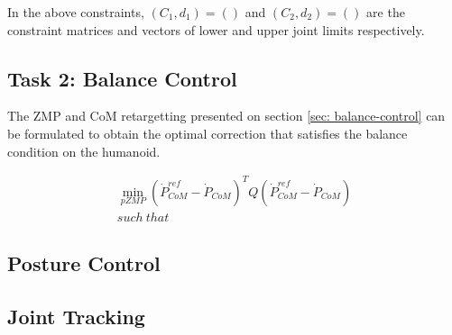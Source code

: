 In the above constraints, $(C_1, d_1) = ()$ and $(C_2, d_2) = ()$ are the constraint matrices and vectors of lower and upper joint limits respectively.

\subsection[Balance Control]{Task 2: Balance Control}

The ZMP and CoM retargetting presented on section \ref{sec: balance-control} can be formulated to obtain the optimal correction that 
satisfies the balance condition on the humanoid.

\begin{eqnarray}
    \label{eq: balance-task-1}
    \min_{pZMP} (\dot{P}_{CoM}^{ref} - \dot{P}_{CoM})^T Q (\dot{P}_{CoM}^{ref} - \dot{P}_{CoM}) \\
    \mathit{such \ that} \ 
\end{eqnarray}
\subsection{Posture Control}
\subsection{Joint Tracking}